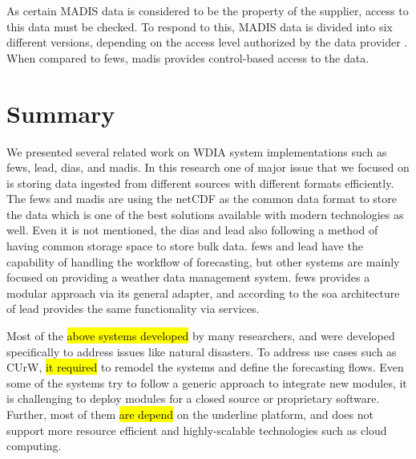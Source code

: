 As certain MADIS data is considered to be the property of the supplier, access to this data must be checked. To respond to this, MADIS data is divided into six different versions, depending on the access level authorized by the data provider \cite{Macdermaid2005ArchitectureP2.39}. When compared to \acrshort{fews}, \acrshort{madis} provides control-based access to the data.



\section{Summary}
\label{se:lit_summary}
We presented several related work on WDIA system implementations such as \acrshort{fews}, \acrshort{lead}, \acrshort{dias}, and \acrshort{madis}. In this research one of major issue that we focused on is storing data ingested from different sources with different formats efficiently. The \acrshort{fews} and \acrshort{madis} are using the \acrshort{netCDF} as the common data format to store the data which is one of the best solutions available with modern technologies as well. Even it is not mentioned, the \acrshort{dias} and \acrshort{lead} also following a method of having common storage space to store bulk data.
\acrshort{fews} and \acrshort{lead} have the capability of handling the workflow of forecasting, but other systems are mainly focused on providing a weather data management system.
\acrshort{fews} provides a modular approach via its general adapter, and according to the \acrshort{soa} architecture of \acrshort{lead} provides the same functionality via services.

Most of the \hl{above systems developed} by many researchers, and were developed specifically to address issues like natural disasters. To address use cases such as CUrW, \hl{it required} to remodel the systems  and define the forecasting flows. Even some of the systems try to follow a generic approach to integrate new modules, it is challenging to deploy modules for a closed source or proprietary software. Further, most of them \hl{are depend} on the underline platform, and does not support more resource efficient and highly-scalable technologies such as cloud computing.
